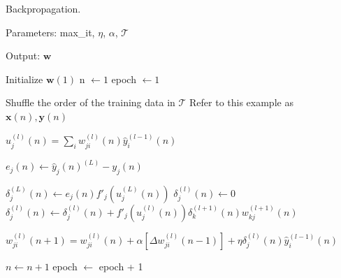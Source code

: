 \begin{algorithm}[h!]
    \caption{Backpropagation. \label{alg:backprop}}
    
    Parameters: max\_it, $\eta$, $\alpha$, $\mathcal{T}$
    
    Output: $\mathbf{w}$
    
    \begin{algorithmic}[1] 
        \STATE Initialize $\mathbf{w}(1)$
        \STATE n $\leftarrow 1$
        \STATE epoch $\leftarrow 1$

		\STATE Shuffle the order of the training data in $\mathcal{T}$
			\STATE Refer to this example as $\mathbf{x}(n),\mathbf{y}(n)$ 
                
                        \STATE $u_j^{(l)}(n) = \sum_i w_{ji}^{(l)}(n) \hat{y}_i^{(l-1)}(n)$ 
                    \ENDFOR

					
                \ENDFOR
            
            \ENDFOR
            

                    \STATE $e_j (n) \leftarrow \hat{y}_j(n)^{(L)} - y_j (n)$ 
            \ENDFOR


                        \STATE $ \delta_j^{(L)} (n) \leftarrow e_j(n) {f}'_j (u_j^{(L)}(n)) $ 
                    \ELSE
                    	  \STATE $\delta_j^{(l)} (n) \leftarrow 0$
                            \STATE $ \delta_j^{(l)} (n) \leftarrow \delta_j^{(l)} (n) + {f}'_j (u_j^{(l)}(n)) \delta_k^{(l+1)} (n) w_{kj}^{(l+1)}(n) $ 
                        \ENDFOR
                    \ENDIF

                        \STATE $w_{ji}^{(l)} (n+1) = w_{ji}^{(l)}(n) + \alpha[\Delta w_{ji}^{(l)}(n-1)] + \eta \delta_j^{(l)}(n) \hat{y}_i^{(l-1)} (n)$ 
                    \ENDFOR
                \ENDFOR

            \ENDFOR

            \STATE $n \leftarrow n + 1 $
		\ENDFOR
            \STATE epoch $\leftarrow$ epoch + 1
        \ENDWHILE
    \end{algorithmic}
\end{algorithm}

